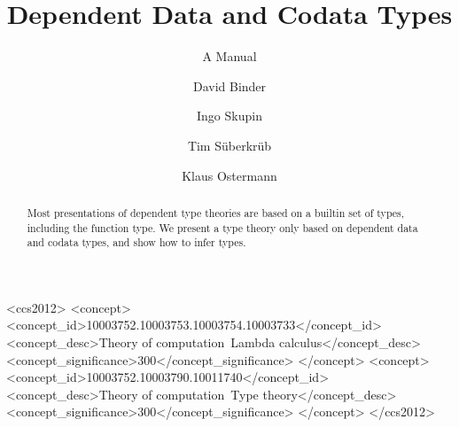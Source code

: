 \documentclass[acmsmall,review,anonymous]{acmart}
\begin{document}
\title{Dependent Data and Codata Types}
\subtitle{A Manual}



\begin{CCSXML}
  <ccs2012>
  <concept>
  <concept_id>10003752.10003753.10003754.10003733</concept_id>
  <concept_desc>Theory of computation~Lambda calculus</concept_desc>
  <concept_significance>300</concept_significance>
  </concept>
  <concept>
  <concept_id>10003752.10003790.10011740</concept_id>
  <concept_desc>Theory of computation~Type theory</concept_desc>
  <concept_significance>300</concept_significance>
  </concept>
  </ccs2012>
\end{CCSXML}


\author{David Binder}

\author{Ingo Skupin}

\author{Tim Süberkrüb}

\author{Klaus Ostermann}

\begin{abstract}
  Most presentations of dependent type theories are based on a builtin set of types, including the function type.
  We present a type theory only based on dependent data and codata types, and show how to infer types.
\end{abstract}
\end{document}
